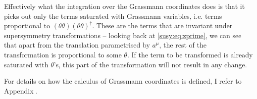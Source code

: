 \documentclass[../main.tex]{subfiles}
\begin{document}
Effectively what the integration over the Grassmann coordinates does is that it picks out only the terms saturated with Grassmann variables, i.e. terms proportional to \((\theta\theta)(\theta\theta)^\dagger\).
These are the terms that are invariant under supersymmetry transformations -- looking back at \cref{susy:eq:zprime}, we can see that apart from the translation parametrised by \(a^\mu\), the rest of the transformation is proportional to some \(\theta\).
If the term to be transformed is already saturated with \(\theta\)'s, this part of the transformation will not result in any change.

For details on how the calculus of Grassmann coordinates is defined, I refer to Appendix \needcite.
\\
\end{document}
